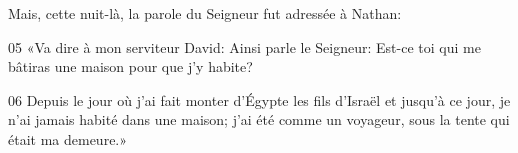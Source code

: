 Mais, cette nuit-là, la parole du Seigneur fut adressée à Nathan:

05 «Va dire à mon serviteur David: Ainsi parle le Seigneur: Est-ce toi qui me bâtiras une maison pour que j’y habite?

06 Depuis le jour où j’ai fait monter d’Égypte les fils d’Israël et jusqu’à ce jour, je n’ai jamais habité dans une maison; j’ai été comme un voyageur, sous la tente qui était ma demeure.»
